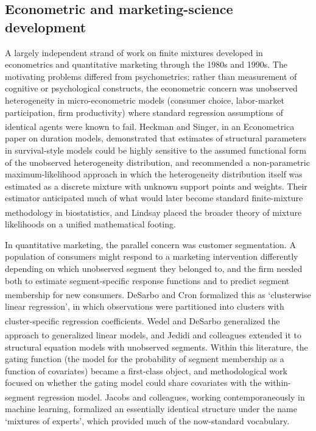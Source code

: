 \documentclass[
  11pt,
]{article}
\begin{document}
\subsection{Econometric and marketing-science development}\label{econometric-and-marketing-science-development}

A largely independent strand of work on finite mixtures developed in
econometrics and quantitative marketing through the 1980s and 1990s.
The motivating problems differed from psychometrics: rather than
measurement of cognitive or psychological constructs, the econometric
concern was unobserved heterogeneity in micro-econometric models
(consumer choice, labor-market participation, firm productivity) where
standard regression assumptions of identical agents were known to fail.
Heckman and Singer\textsuperscript{}, in an Econometrica paper on
duration models, demonstrated that estimates of structural parameters
in survival-style models could be highly sensitive to the assumed
functional form of the unobserved heterogeneity distribution, and
recommended a non-parametric maximum-likelihood approach in which the
heterogeneity distribution itself was estimated as a discrete mixture
with unknown support points and weights. Their estimator anticipated
much of what would later become standard finite-mixture methodology in
biostatistics, and Lindsay\textsuperscript{} placed the broader theory
of mixture likelihoods on a unified mathematical footing.

In quantitative marketing, the parallel concern was customer
segmentation. A population of consumers might respond to a marketing
intervention differently depending on which unobserved segment they
belonged to, and the firm needed both to estimate segment-specific
response functions and to predict segment membership for new consumers.
DeSarbo and Cron\textsuperscript{} formalized this as `clusterwise
linear regression', in which observations were partitioned into
clusters with cluster-specific regression coefficients. Wedel and
DeSarbo\textsuperscript{} generalized the approach to generalized
linear models, and Jedidi and colleagues\textsuperscript{} extended it to
structural equation models with unobserved segments. Within this
literature, the gating function (the model for the probability of
segment membership as a function of covariates) became a first-class
object, and methodological work focused on whether the gating model
could share covariates with the within-segment regression model.
Jacobs and colleagues\textsuperscript{}, working contemporaneously in
machine learning, formalized an essentially identical structure under
the name `mixtures of experts', which provided much of the
now-standard vocabulary.
\end{document}
